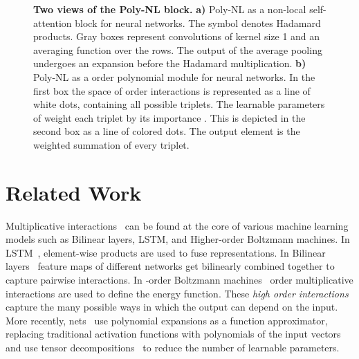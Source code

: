 \documentclass[10pt,twocolumn,letterpaper]{article}
\begin{document}
\begin{figure*}[t]
  \hspace*{0.5cm}
     \vspace{-0.3cm}
    \caption{ \textbf{Two views of the Poly-NL block.} \textbf{ a)} Poly-NL as a non-local self-attention block for neural networks. The symbol  denotes Hadamard products. Gray boxes represent convolutions of kernel size 1 and an averaging function over the rows. The output of the average pooling undergoes an expansion before the Hadamard multiplication.  \textbf{b)} Poly-NL as a  order polynomial module for neural networks. In the first box the space of  order interactions is represented as a line of  white dots, containing all possible triplets. The learnable parameters of  weight each triplet  by its importance . This is depicted in the second box as a line of colored dots. The output element  is the weighted summation of every triplet.  \vspace{-0.3cm}}
\label{fig:iiipoly}
\hspace*{-1cm}
\end{figure*}


\section{Related Work}
Multiplicative interactions~\cite{jayakumar2019multiplicative} can be found at the core of various machine learning models such as Bilinear layers, LSTM, and Higher‐order Boltzmann machines. In LSTM~\cite{hochreiter1997long, krause2016multiplicative}, element-wise products are used to fuse representations. In Bilinear layers~\cite{tenenbaum2000separating, carreira2012semantic, lin2015bilinear, yu2018hierarchical} feature maps of different networks get bilinearly combined together to capture pairwise interactions. In ‐order Boltzmann machines~\cite{memisevic2007unsupervised,memisevic2010learning,sejnowski1986higher}  order multiplicative interactions are used to define the energy function. These \textit{high order interactions} capture the many possible ways in which the output can depend on the input. More recently, nets~\cite{chrysos2020p} use polynomial expansions as a function approximator, replacing traditional activation functions with polynomials of the input vectors and use tensor decompositions~\cite{kolda2009tensor} to reduce the number of learnable parameters. 
 
\end{document}
